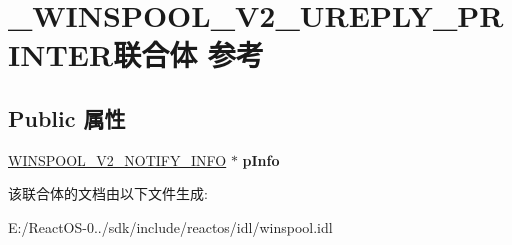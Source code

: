 \hypertarget{union___w_i_n_s_p_o_o_l___v2___u_r_e_p_l_y___p_r_i_n_t_e_r}{}\section{\+\_\+\+W\+I\+N\+S\+P\+O\+O\+L\+\_\+\+V2\+\_\+\+U\+R\+E\+P\+L\+Y\+\_\+\+P\+R\+I\+N\+T\+E\+R联合体 参考}
\label{union___w_i_n_s_p_o_o_l___v2___u_r_e_p_l_y___p_r_i_n_t_e_r}
\subsection*{Public 属性}
\begin{DoxyCompactItemize}
\item 
\mbox{\label{union___w_i_n_s_p_o_o_l___v2___u_r_e_p_l_y___p_r_i_n_t_e_r_a81de6803c22d542d54da8bb0d1eb0603}} 
\hyperlink{struct___w_i_n_s_p_o_o_l___v2___n_o_t_i_f_y___i_n_f_o}{W\+I\+N\+S\+P\+O\+O\+L\+\_\+\+V2\+\_\+\+N\+O\+T\+I\+F\+Y\+\_\+\+I\+N\+FO} $\ast$ {\bfseries p\+Info}
\end{DoxyCompactItemize}


该联合体的文档由以下文件生成\+:\begin{DoxyCompactItemize}
\item 
E\+:/\+React\+O\+S-\/0../sdk/include/reactos/idl/winspool.\+idl\end{DoxyCompactItemize}
